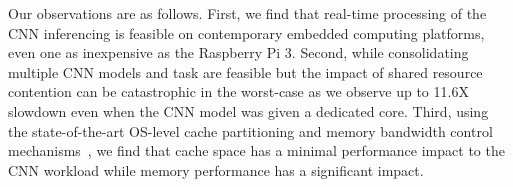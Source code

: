 %
%
%
%
%
%
Our observations are as follows.
First, we find that real-time processing of the CNN inferencing is
feasible on contemporary embedded computing platforms, even one   
as inexpensive as the Raspberry Pi 3. Second, while consolidating
multiple CNN models and task are feasible but the impact of shared
resource contention can be catastrophic in the worst-case as we
observe up to 11.6X slowdown even when the CNN model was given a
dedicated core. Third, using the state-of-the-art OS-level cache
partitioning and memory bandwidth control
mechanisms~\cite{yun2014rtas,Yun2013}, we find that cache space has a
minimal performance impact to the CNN workload while memory
performance has a significant impact.


